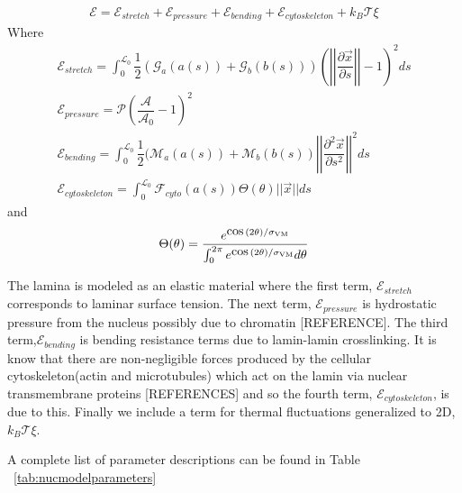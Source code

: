 \begin{align}
\mathcal{E} = \mathcal{E}_{stretch} + \mathcal{E}_{pressure} +\mathcal{E}_{bending} + \mathcal{E}_{cytoskeleton} + k_B\mathcal{T} \xi
\end{align}
Where 
\begin{align}
\mathcal{E}_{stretch} = \displaystyle \int_0^{\mathcal{L}_0} \dfrac{1}{2} (\mathcal{G}_a(a(s)) +\mathcal{G}_b(b(s)) )\left( \left |\left| \dfrac{\partial \vec{x} }{\partial s} \right|\right| - 1\right)^2 ds \\
\mathcal{E}_{pressure}  = \mathcal{P} \left( \dfrac{\mathcal{A}}{\mathcal{A}_0} -1\right)^2  \\
\mathcal{E}_{bending} = \displaystyle\int_0^{\mathcal{L}_0} \dfrac{1}{2 } (\mathcal{M}_a(a(s)) + \mathcal{M}_b (b(s)) \left|\left| \dfrac{\partial^2 \vec{x}}{\partial s^2} \right|\right|^2 ds\\
\mathcal{E}_{cytoskeleton} = \displaystyle\int_0^{\mathcal{L}_0} \mathcal{F}_{cyto} (a(s))\Theta (\theta) || \vec{x} || ds 
\end{align}
and \[ \Theta (\theta) = \dfrac{e^{\cos(2\theta)/\sigma_{\rm VM }}}{\int_0^{ 2\pi} e^{\cos(2\theta)/\sigma_{\rm VM}}d \theta} \]

The lamina is modeled as an elastic material where the first term, $\mathcal{E}_{stretch}$ corresponds to laminar surface tension. The next term, $\mathcal{E}_{pressure}$ is hydrostatic pressure from the nucleus possibly due to chromatin [REFERENCE]. The third term,$\mathcal{E}_{bending}$  is bending resistance terms due to lamin-lamin crosslinking. It is know that there are non-negligible forces produced by the cellular cytoskeleton(actin and microtubules) which act on the lamin via nuclear transmembrane proteins [REFERENCES] and so the fourth term, $\mathcal{E}_{cytoskeleton}$, is due to this. Finally we include a term for thermal fluctuations generalized to 2D, $k_B\mathcal{T} \xi$. 


A complete list of parameter descriptions can be found in Table ~\ref{tab:nucmodelparameters}


